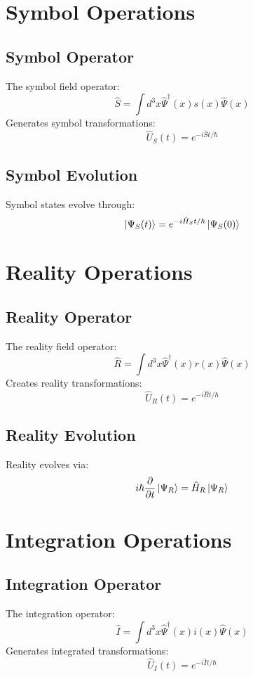 \documentclass[12pt]{article}
\begin{document}
\section{Symbol Operations}
\subsection{Symbol Operator}
The symbol field operator:
\begin{equation}
\hat{S} = \int d^3x \hat{\Psi}^\dagger(x)s(x)\hat{\Psi}(x)
\end{equation}
Generates symbol transformations:
\begin{equation}
\hat{U}_S(t) = e^{-i\hat{S}t/\hbar}
\end{equation}
\subsection{Symbol Evolution}
Symbol states evolve through:
\begin{equation}
\ket{\Psi_S(t)} = e^{-i\hat{H}_St/\hbar}\ket{\Psi_S(0)}
\end{equation}
\section{Reality Operations}
\subsection{Reality Operator}
The reality field operator:
\begin{equation}
\hat{R} = \int d^3x \hat{\Psi}^\dagger(x)r(x)\hat{\Psi}(x)
\end{equation}
Creates reality transformations:
\begin{equation}
\hat{U}_R(t) = e^{-i\hat{R}t/\hbar}
\end{equation}
\subsection{Reality Evolution}
Reality evolves via:
\begin{equation}
i\hbar\frac{\partial}{\partial t}\ket{\Psi_R} = \hat{H}_R\ket{\Psi_R}
\end{equation}
\section{Integration Operations}
\subsection{Integration Operator}
The integration operator:
\begin{equation}
\hat{I} = \int d^3x \hat{\Psi}^\dagger(x)i(x)\hat{\Psi}(x)
\end{equation}
Generates integrated transformations:
\begin{equation}
\hat{U}_I(t) = e^{-i\hat{I}t/\hbar}
\end{equation}
\end{document}
